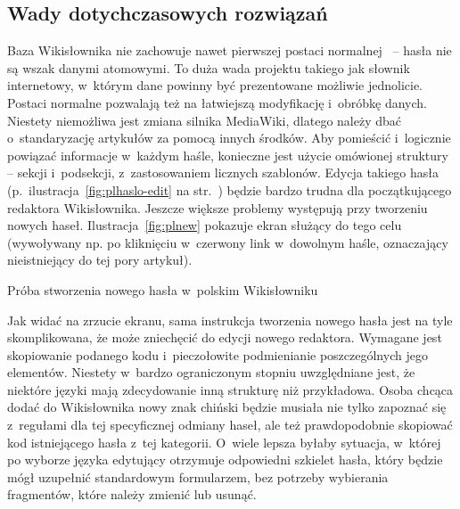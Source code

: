 \subsection{Wady dotychczasowych rozwiązań}
Baza Wikisłownika nie zachowuje nawet pierwszej postaci normalnej~\cite{book:introduction} -- hasła nie są wszak danymi atomowymi. To duża wada projektu takiego jak słownik internetowy, w~którym dane powinny być prezentowane możliwie jednolicie. Postaci normalne pozwalają też na łatwiejszą modyfikację i~obróbkę danych. Niestety niemożliwa jest zmiana silnika MediaWiki, dlatego należy dbać o~standaryzację artykułów za pomocą innych środków. Aby pomieścić i~logicznie powiązać informacje w~każdym haśle, konieczne jest użycie omówionej struktury -- sekcji i~podsekcji, z~zastosowaniem licznych szablonów. Edycja takiego hasła (p.~ilustracja~\ref{fig:plhaslo-edit} na str.~\pageref{fig:plhaslo-edit}) będzie bardzo trudna dla początkującego redaktora Wikisłownika. Jeszcze większe problemy występują przy tworzeniu nowych haseł. Ilustracja~\ref{fig:plnew} pokazuje ekran służący do tego celu (wywoływany np. po kliknięciu w~czerwony link w~dowolnym haśle, oznaczający nieistniejący do tej pory artykuł).

\begin{illustration}
	\caption{Próba stworzenia nowego hasła w~polskim Wikisłowniku}
	\label{fig:plnew}
\end{illustration}

Jak widać na zrzucie ekranu, sama instrukcja tworzenia nowego hasła jest na tyle skomplikowana, że może zniechęcić do edycji nowego redaktora. Wymagane jest skopiowanie podanego kodu i~pieczołowite podmienianie poszczególnych jego elementów. Niestety w~bardzo ograniczonym stopniu uwzględniane jest, że niektóre języki mają zdecydowanie inną strukturę niż przykładowa. Osoba chcąca dodać do Wikisłownika nowy znak chiński będzie musiała nie tylko zapoznać się z~regułami dla tej specyficznej odmiany haseł, ale też prawdopodobnie skopiować kod istniejącego hasła z~tej kategorii. O~wiele lepsza byłaby sytuacja, w~której po wyborze języka edytujący otrzymuje odpowiedni szkielet hasła, który będzie mógł uzupełnić standardowym formularzem, bez potrzeby wybierania fragmentów, które należy zmienić lub usunąć.


